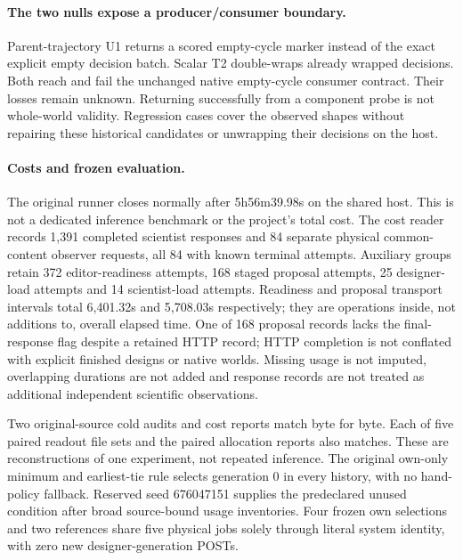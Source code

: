\paragraph{The two nulls expose a producer/consumer boundary.}
Parent-trajectory U1 returns a scored empty-cycle marker instead of the exact
explicit empty decision batch. Scalar T2 double-wraps already wrapped decisions.
Both reach and fail the unchanged native empty-cycle consumer contract. Their
losses remain unknown. Returning successfully from a component probe is not
whole-world validity. Regression cases cover the observed shapes without
repairing these historical candidates or unwrapping their decisions on the host.

\paragraph{Costs and frozen evaluation.}
The original runner closes normally after 5h56m39.98s on the shared host.
This is not a dedicated inference benchmark or the project's total cost.
The cost reader records 1,391 completed scientist responses and 84 separate
physical common-content observer requests, all 84 with known terminal attempts.
Auxiliary groups retain 372 editor-readiness attempts, 168 staged proposal
attempts, 25 designer-load attempts and 14 scientist-load attempts. Readiness
and proposal transport intervals total 6,401.32s and 5,708.03s respectively;
they are operations inside, not additions to, overall elapsed time. One of 168
proposal records lacks the final-response flag despite a retained HTTP record;
HTTP completion is not conflated with explicit finished designs or native worlds.
Missing usage is not imputed, overlapping durations are not added and response
records are not treated as additional independent scientific observations.

Two original-source cold audits and cost reports match byte for byte. Each of
five paired readout file sets and the paired allocation reports also matches.
These are reconstructions of one experiment, not repeated inference. The
original own-only minimum and earliest-tie rule selects generation 0 in every
history, with no hand-policy fallback. Reserved seed 676047151 supplies the
predeclared unused condition after broad source-bound usage inventories.
Four frozen own selections and two references share five physical jobs solely
through literal system identity, with zero new designer-generation POSTs.
